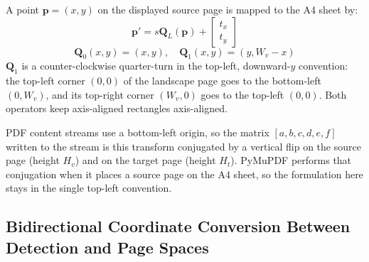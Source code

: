 A point $\mathbf{p} = (x, y)$ on the displayed source page is mapped to the A4 sheet by:
\begin{equation}
\label{eq:point_mapping}
\mathbf{p}' = s \mathbf{Q}_L(\mathbf{p}) + \begin{bmatrix} t_x \\ t_y \end{bmatrix}
\end{equation}
\begin{equation}
\label{eq:rotation_operators}
\mathbf{Q}_0(x, y) = (x, y), \quad \mathbf{Q}_1(x, y) = (y, W_v - x)
\end{equation}
$\mathbf{Q}_1$ is a counter-clockwise quarter-turn in the top-left, downward-$y$ convention: the top-left corner $(0, 0)$ of the landscape page goes to the bottom-left $(0,W_v)$, and its top-right corner $(W_v, 0)$ goes to the top-left $(0, 0)$. Both operators keep axis-aligned rectangles axis-aligned.

PDF content streams use a bottom-left origin, so the matrix $[a,b,c,d,e,f]$ written to the stream is this transform conjugated by a vertical flip on the source page (height $H_v$) and on the target page (height $H_t$). PyMuPDF performs that conjugation when it places a source page on the A4 sheet, so the formulation here stays in the single top-left convention.

\subsection{Bidirectional Coordinate Conversion Between Detection and Page Spaces}
\label{sec:coordinate_conversion}


